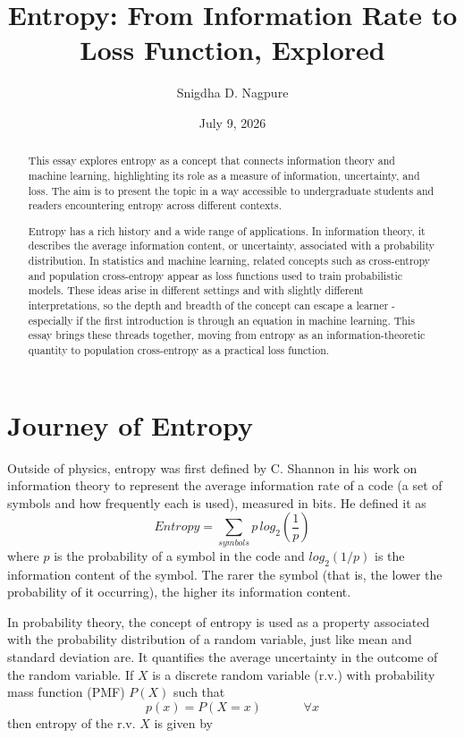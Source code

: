 \documentclass[fleqn, 12pt]{article}
\title{\textbf{\large Entropy: From Information Rate to Loss Function, Explored}}
\author{{\large Snigdha D. Nagpure}}
\date{July 9, 2026}
\begin{document}
\maketitle

\begin{abstract}
This essay explores entropy as a concept that connects information theory and machine learning, highlighting its role as a measure of information, uncertainty, and loss. The aim is to present the topic in a way accessible to undergraduate students and readers encountering entropy across different contexts.

Entropy has a rich history and a wide range of applications. In information theory, it describes the average information content, or uncertainty, associated with a probability distribution. In statistics and machine learning, related concepts such as cross-entropy and population cross-entropy appear as loss functions used to train probabilistic models. These ideas arise in different settings and with slightly different interpretations, so the depth and breadth of the concept can escape a learner - especially if the first introduction is through an equation in machine learning. This essay brings these threads together, moving from entropy as an information-theoretic quantity to population cross-entropy as a practical loss function.
\end{abstract}

\section{Journey of Entropy}
Outside of physics, entropy was first defined by C. Shannon in his work on information theory to represent the average information rate of a code (a set of symbols and how frequently each is used), measured in bits. He defined it as
\begin{equation}
    Entropy = \sum_{symbols}{p\,log_2(\frac{1}{p})}
\end{equation}
where $p$ is the probability of a symbol in the code and $log_2(1/p)$ is the information content of the symbol. The rarer the symbol (that is, the lower the probability of it occurring), the higher its information content.

In probability theory, the concept of entropy is used as a property associated with the probability distribution of a random variable, just like mean and standard deviation are. It quantifies the average uncertainty in the outcome of the random variable. If $X$ is a discrete random variable (r.v.) with probability mass function (PMF) $P(X)$ such that
\begin{equation}
    p(x) = P(X=x) \hspace{40pt} \forall x
\end{equation}
then entropy of the r.v. $X$ is given by
\end{document}
